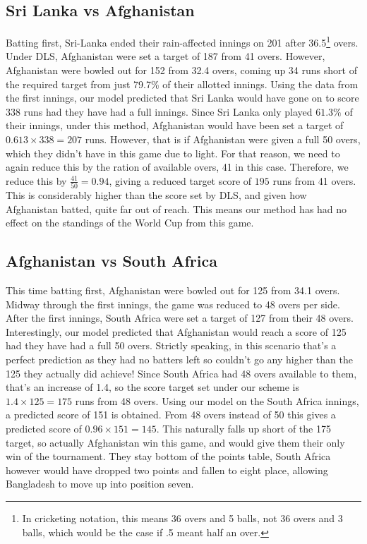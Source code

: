 \subsection{Sri Lanka vs Afghanistan}
Batting first, Sri-Lanka ended their rain-affected innings on 201 after 36.5\footnote{In cricketing notation, this means 36 overs and 5 balls, not 36 overs and 3 balls, which would be the case if .5 meant half an over.} overs.
Under DLS, Afghanistan were set a target of 187 from 41 overs. However, Afghanistan were bowled out for 152 from 32.4 overs, coming up 34 runs short of the required target from just 79.7\% of their allotted innings. 
Using the data from the first innings, our model predicted that Sri Lanka would have gone on to score 338 runs had they have had a full innings. Since Sri Lanka only played $61.3\%$ of their innings, under this method, Afghanistan 
would have been set a target of $0.613 \times 338 = 207 \text{ runs}$. However, that is if Afghanistan were given a full 50 overs, which they didn't have in this game due to light. For that reason, we need 
to again reduce this by the ration of available overs, 41 in this case. Therefore, we reduce this by $\frac{41}{50}=0.94$, giving a reduced target score of $195$ runs from 41 overs. This is considerably higher than the 
score set by DLS, and given how Afghanistan batted, quite far out of reach. This means our method has had no effect on the standings of the World Cup from this game.

\subsection{Afghanistan vs South Africa}
This time batting first, Afghanistan were bowled out for 125 from 34.1 overs. Midway through the first innings, the game was reduced to 48 overs per side. After the first innings, South Africa were set 
a target of 127 from their 48 overs. Interestingly, our model predicted that Afghanistan would reach a score of 125 had they have had a full 50 overs. Strictly speaking, in this scenario that's a perfect prediction 
as they had no batters left so couldn't go any higher than the 125 they actually did achieve! Since South Africa had 48 overs available to them, that's an increase of 1.4, so the score target set under our scheme
is $1.4 \times 125 = 175$ runs from 48 overs. Using our model on the South Africa innings, a predicted score of 151 is obtained. From 48 overs instead of 50 this gives a predicted score of $0.96 \times 151 = 145$. 
This naturally falls up short of the 175 target, so actually Afghanistan win this game, and would give them their only win of the tournament. They stay bottom of the points table, South Africa however would have 
dropped two points and fallen to eight place, allowing Bangladesh to move up into position seven. 

